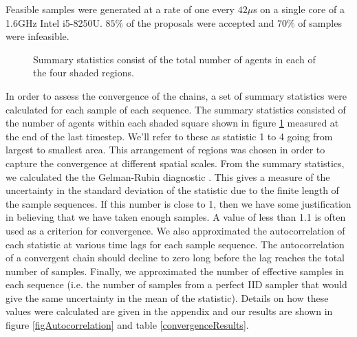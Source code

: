 \documentclass{article}
\begin{document}
Feasible samples were generated at a rate of one every $42\mu$s on a single core of a 1.6GHz Intel i5-8250U. $85\%$ of the proposals were accepted and $70\%$ of samples were infeasible. 

\begin{figure}
	\centering
	\caption{Summary statistics consist of the total number of agents in each of the four shaded regions.}
	\label{figRegions}
\end{figure}
In order to assess the convergence of the chains, a set of summary statistics were calculated for each sample of each sequence. The summary statistics consisted of the number of agents within each shaded square shown in figure \ref{figRegions} measured at the end of the last timestep. We'll refer to these as statistic 1 to 4 going from largest to smallest area. This arrangement of regions was chosen in order to capture the convergence at different spatial scales. From the summary statistics, we calculated the the Gelman-Rubin diagnostic \citep{gelman1992inference}. This gives a measure of the uncertainty in the standard deviation of the statistic due to the finite length of the sample sequences. If this number is close to 1, then we have some justification in believing that we have taken enough samples. A value of less than 1.1 is often used as a criterion for convergence. We also approximated the autocorrelation of each statistic at various time lags for each sample sequence. The autocorrelation of a convergent chain should decline to zero long before the lag reaches the total number of samples. Finally, we approximated the number of effective samples in each sequence (i.e. the number of samples from a perfect IID sampler that would give the same uncertainty in the mean of the statistic). Details on how these values were calculated are given in the appendix and our results are shown in figure \ref{figAutocorrelation} and table \ref{convergenceResults}.
\end{document}
